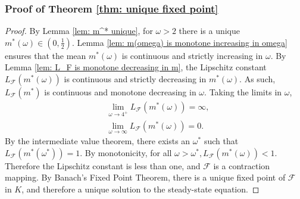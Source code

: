 \documentclass[10pt]{article}
\begin{document}
\subsubsection*{Proof of Theorem \ref{thm: unique fixed point}}
\begin{proof}
    By Lemma \ref{lem: m^* unique}, for $\omega>2$ there is a unique $m^*(\omega) \in (0,\frac{1}{2})$. Lemma \ref{lem: m(omega) is monotone increasing in omega} ensures that the mean $m^*(\omega)$ is continuous and strictly increasing in $\omega$. By Lemma \ref{lem: L_F is monotone decreasing in m}, the Lipschitz constant $L_\mathcal{F}(m^*(\omega))$ is continuous and strictly decreasing in $m^*(\omega)$. As such, $L_\mathcal{F}(m^*)$ is continuous and monotone decreasing in $\omega$. Taking the limits in $\omega$,
    \begin{align*}
    &\lim_{\omega\rightarrow 4^+} L_\mathcal{F}(m^*(\omega)) = \infty,\\
    &\lim_{\omega\rightarrow \infty} L_\mathcal{F}(m^*(\omega)) = 0.
\end{align*}
    By the intermediate value theorem, there exists an $\omega^*$ such that $L_\mathcal{F}(m^*(\omega^*))=1$. By monotonicity, for all $\omega > \omega^*, L_\mathcal{F}(m^*(\omega)) < 1$. Therefore the Lipschitz constant is less than one, and $\mathcal{F}$ is a contraction mapping. By Banach's Fixed Point Theorem, there is a unique fixed point of $\mathcal{F}$ in $K$, and therefore a unique solution to the steady-state equation.
\end{proof}
\end{document}
